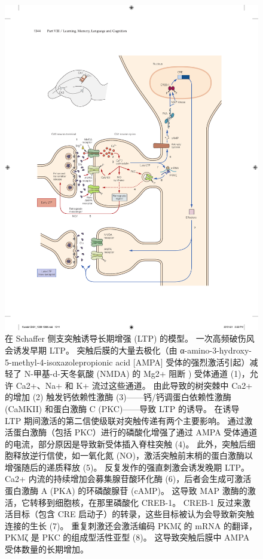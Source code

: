 \begin{figure}[htbp]
	\centering
	\includegraphics[width=0.9\linewidth]{chap54/fig_54_3}
	\caption{在 Schaffer 侧支突触诱导长期增强 (LTP) 的模型。 一次高频破伤风会诱发早期 LTP。 突触后膜的大量去极化（由 α-amino-3-hydroxy-5-methyl-4-isoxazolepropionic acid [AMPA] 受体的强烈激活引起）减轻了 N-甲基-d-天冬氨酸 (NMDA) 的 Mg2+ 阻断 ) 受体通道 (1)，允许 Ca2+、Na+ 和 K+ 流过这些通道。 由此导致的树突棘中 Ca2+ 的增加 (2) 触发钙依赖性激酶 (3)——钙/钙调蛋白依赖性激酶 (CaMKII) 和蛋白激酶 C (PKC)——导致 LTP 的诱导。 在诱导 LTP 期间激活的第二信使级联对突触传递有两个主要影响。 通过激活蛋白激酶（包括 PKC）进行的磷酸化增强了通过 AMPA 受体通道的电流，部分原因是导致新受体插入脊柱突触 (4)。 此外，突触后细胞释放逆行信使，如一氧化氮 (NO)，激活突触前末梢的蛋白激酶以增强随后的递质释放 (5)。 反复发作的强直刺激会诱发晚期 LTP。 Ca2+ 内流的持续增加会募集腺苷酸环化酶 (6)，后者会生成可激活蛋白激酶 A (PKA) 的环磷酸腺苷 (cAMP)。 这导致 MAP 激酶的激活，它转移到细胞核，在那里磷酸化 CREB-1。 CREB-1 反过来激活目标（包含 CRE 启动子）的转录，这些目标被认为会导致新突触连接的生长 (7)。 重复刺激还会激活编码 PKMζ 的 mRNA 的翻译，PKMζ 是 PKC 的组成型活性亚型 (8)。 这导致突触后膜中 AMPA 受体数量的长期增加。}
	\label{fig:54_3}
\end{figure}

